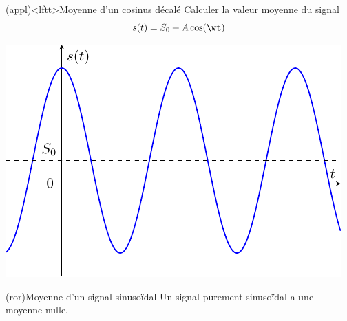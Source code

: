 \documentclass[../../main/main.tex]{subfiles}
\begin{document}
\begin{tcb}[sidebyside, lefthand ratio=.4](appl)<lftt>{Moyenne d'un cosinus décalé}
	Calculer la valeur moyenne du signal
	\[
		s(t) = S_0 + A\cos(\wt)
	\]
	\begin{center}
		\includegraphics[width=\linewidth]{moy_cos-S0}
	\end{center}
	\tcblower
	\vspace{-15pt}
\end{tcb}

\begin{tcb}(ror){Moyenne d'un signal sinusoïdal}
	Un signal purement sinusoïdal a une moyenne nulle.
\end{tcb}
\end{document}
